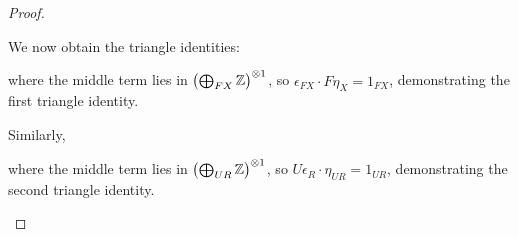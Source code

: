 \documentclass[../../solutions]{subfiles}
\begin{document}
\begin{proof}
\begin{enumerate}[label=(\roman*)]
    We now obtain the triangle identities:
    \begin{center}
    \end{center}
    where the middle term lies in
    $\bigl(\bigoplus_{FX}{\mathbb{Z}}\bigr)^{\otimes1}$, so
    $\epsilon_{FX}\cdot F\eta_X=1_{FX}$, demonstrating the first
    triangle identity.

    Similarly,
    \begin{center}
    \end{center}
    where the middle term lies in
    $\bigl(\bigoplus_{UR}{\mathbb{Z}}\bigr)^{\otimes1}$, so
    $U\epsilon_R\cdot \eta_{UR}=1_{UR}$, demonstrating the second
    triangle identity.
  \end{enumerate}
\end{proof}
\end{document}
